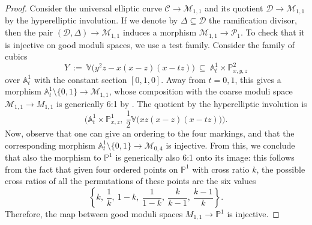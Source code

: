 \documentclass[a4paper,12pt]{amsart}
\newcommand{\bV}{{\mathbb V}}
\newcommand{\bA}{{\mathbb A}}
\newcommand{\bP}{{\mathbb P}}
\newcommand{\sP}{{\mathscr{P}}}
\newcommand\cD{{\mathcal{D}}}
\newcommand\cC{{\mathcal{C}}}
\newcommand\cM{{\mathcal{M}}}
\theoremstyle{definition}
\theoremstyle{remark}
\begin{document}
\begin{proof}
    Consider the universal elliptic curve $\cC\to \cM_{1,1}$ and its quotient $\cD\to \cM_{1,1}$  by the hyperelliptic involution. If we denote by $\Delta\subseteq \cD$ the ramification divisor, then the pair $(\cD,\Delta)\to \cM_{1,1}$ induces a morphism $\cM_{1,1}\to \sP_1$. To check that it is injective on good moduli spaces, we use a test family. Consider the family of cubics
    \[
Y\ :=\ \bV\big(y^2z - x(x-z)(x-tz) \big) \ \subseteq\  \bA^1_{t}\times \bP^2_{x,y,z}
\]
over $\bA^1_t$ with the constant section $[0,1,0]$. Away from $t=0, 1$, this gives a morphism $\bA^1_t\setminus\{0,1\}\to \cM_{1,1}$, whose composition with the coarse moduli space $\cM_{1,1}\to M_{1,1}$ is generically 6:1 by \cite[Proposition 1.7]{silverman2009arithmetic}. The quotient by the hyperelliptic involution is $$\textstyle \big(\bA^1_t\times \bP^1_{x,z}, \ \frac{1}{2}\bV\big(xz(x-z)(x-tz)\big)\big).$$
Now, observe that one can give an ordering to the four markings, and that the corresponding morphism $\bA^1_t\setminus\{0,1\}\rightarrow \cM_{0,4}$ is injective.
From this, we conclude that also the morphism to $\bP^1$ is generically also 6:1 onto its image: this follows from the fact that given four ordered points on $\bP^1$ with cross ratio $k$, the possible cross ratios of all the permutations of these points are the six values $$\textstyle \left\{k,\ \frac{1}{k},\  1-k, \ \frac{1}{1-k},\  \frac{k}{k-1},\ \frac{k-1}{k}\right\}.$$ Therefore, the map between good moduli spaces $M_{1,1}\to \bP^1$ is injective.
\end{proof}
\end{document}

